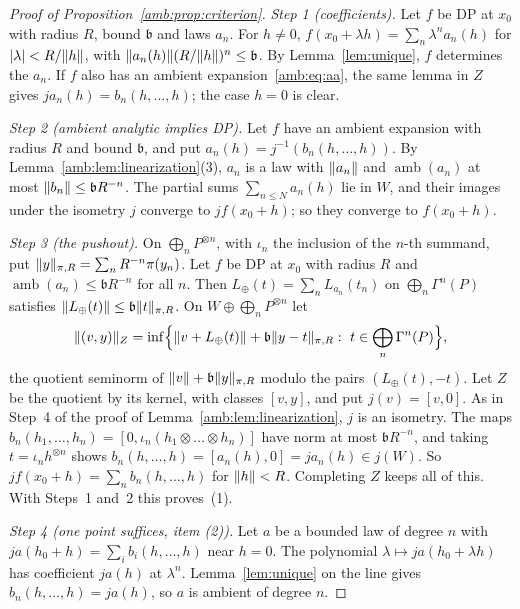 \begin{proof}[Proof of Proposition~\ref{amb:prop:criterion}]
\emph{Step 1 (coefficients).} Let $f$ be DP at $x_0$ with radius $R$, bound $\mathfrak b$ and laws $a_n$. For $h\ne0$, $f(x_0+\lambda h)=\sum_n\lambda^na_n(h)$ for $\lvert \lambda\rvert<R/\lVert h\rVert$, with $\lVert a_n(h)\rVert(R/\lVert h\rVert)^n\le \mathfrak b$. By Lemma~\ref{lem:unique}, $f$ determines the $a_n$. If $f$ also has an ambient expansion~\eqref{amb:eq:aa}, the same lemma in $Z$ gives $ja_n(h)=b_n(h,\dots,h)$; the case $h=0$ is clear.

\emph{Step 2 (ambient analytic implies DP).} Let $f$ have an ambient expansion with radius $R$ and bound $\mathfrak b$, and put $a_n(h)=j^{-1}(b_n(h,\dots,h))$. By Lemma~\ref{amb:lem:linearization}(3), $a_n$ is a law with $\lVert a_n\rVert$ and $\operatorname{amb}(a_n)$ at most $\lVert b_n\rVert\le \mathfrak bR^{-n}$. The partial sums $\sum_{n\le N}a_n(h)$ lie in $W$, and their images under the isometry $j$ converge to $jf(x_0+h)$; so they converge to $f(x_0+h)$.

\emph{Step 3 (the pushout).} On $\bigoplus_nP^{\otimes n}$, with $\iota_n$ the inclusion of the $n$\nobreakdash-th summand, put $\lVert y\rVert_{\pi,R}=\sum_nR^{-n}\pi(y_n)$. Let $f$ be DP at $x_0$ with radius $R$ and $\operatorname{amb}(a_n)\le \mathfrak bR^{-n}$ for all $n$. Then $L_\oplus(t)=\sum_nL_{a_n}(t_n)$ on $\bigoplus_n\Gamma^n(P)$ satisfies $\lVert L_\oplus(t)\rVert\le \mathfrak b\lVert t\rVert_{\pi,R}$. On $W\oplus\bigoplus_nP^{\otimes n}$ let
\begin{equation}\label{amb:eq:pushout}
 \lVert (v,y)\rVert_Z=\inf\Bigl\{\lVert v+L_\oplus(t)\rVert+\mathfrak b\lVert y-t\rVert_{\pi,R}:\ t\in\bigoplus_n\Gamma^n(P)\Bigr\},
\end{equation}
the quotient seminorm of $\lVert v\rVert+\mathfrak b\lVert y\rVert_{\pi,R}$ modulo the pairs $(L_\oplus(t),-t)$. Let $Z$ be the quotient by its kernel, with classes $[v,y]$, and put $j(v)=[v,0]$. As in Step~4 of the proof of Lemma~\ref{amb:lem:linearization}, $j$ is an isometry. The maps $b_n(h_1,\dots,h_n)=[0,\iota_n(h_1\otimes\dots\otimes h_n)]$ have norm at most $\mathfrak bR^{-n}$, and taking $t=\iota_nh^{\otimes n}$ shows $b_n(h,\dots,h)=[a_n(h),0]=ja_n(h)\in j(W)$. So $jf(x_0+h)=\sum_nb_n(h,\dots,h)$ for $\lVert h\rVert<R$. Completing $Z$ keeps all of this. With Steps~1 and~2 this proves~(1).

\emph{Step 4 (one point suffices, item (2)).} Let $a$ be a bounded law of degree $n$ with $ja(h_0+h)=\sum_ib_i(h,\dots,h)$ near $h=0$. The polynomial $\lambda\mapsto ja(h_0+\lambda h)$ has coefficient $ja(h)$ at $\lambda^n$. Lemma~\ref{lem:unique} on the line gives $b_n(h,\dots,h)=ja(h)$, so $a$ is ambient of degree $n$.
\end{proof}

